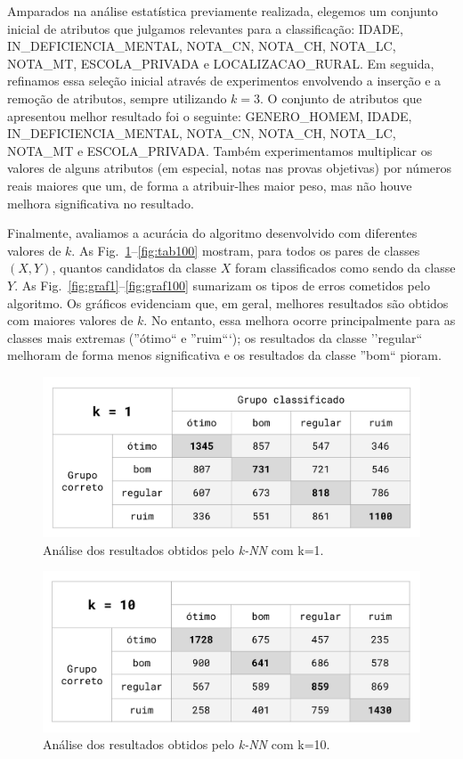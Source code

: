 \documentclass[12pt]{article}
\begin{document}
Amparados na análise estatística previamente realizada, elegemos um conjunto inicial de atributos que julgamos relevantes para a classificação: IDADE, IN\_DEFICIENCIA\_MENTAL, NOTA\_CN, NOTA\_CH, NOTA\_LC, NOTA\_MT, ESCOLA\_PRIVADA e LOCALIZACAO\_RURAL.
Em seguida, refinamos essa seleção inicial através de experimentos envolvendo a inserção e a remoção de atributos, sempre utilizando $k=3$.
O conjunto de atributos que apresentou melhor resultado foi o seguinte: GENERO\_HOMEM, IDADE, IN\_DEFICIENCIA\_MENTAL, NOTA\_CN, NOTA\_CH, NOTA\_LC, NOTA\_MT e ESCOLA\_PRIVADA.
Também experimentamos multiplicar os valores de alguns atributos (em especial, notas nas provas objetivas) por números reais maiores que um, de forma a atribuir-lhes maior peso, mas não houve melhora significativa no resultado.

Finalmente, avaliamos a acurácia do algoritmo desenvolvido com diferentes valores de $k$.
As Fig.~\ref{fig:tab1}--\ref{fig:tab100} mostram, para todos os pares de classes $(X, Y)$, quantos candidatos da classe $X$ foram classificados como sendo da classe $Y$.
As Fig.~\ref{fig:graf1}--\ref{fig:graf100} sumarizam os tipos de erros cometidos pelo algoritmo.
Os gráficos evidenciam que, em geral, melhores resultados são obtidos com maiores valores de $k$.
No entanto, essa melhora ocorre principalmente para as classes mais extremas (''ótimo`` e ''ruim```); os resultados da classe ''regular`` melhoram de forma menos significativa e os resultados da classe ''bom`` pioram.

\begin{figure}[H]
\centering\includegraphics[width=.60\linewidth]{plot-white1.png}
\caption{Análise dos resultados obtidos pelo \emph{k-NN} com k=1.}
\label{fig:tab1}
\end{figure}

\begin{figure}[H]
\centering\includegraphics[width=.60\linewidth]{plot-white10.png}
\caption{Análise dos resultados obtidos pelo \emph{k-NN} com k=10.}
\label{fig:tab10}
\end{figure}
\end{document}
